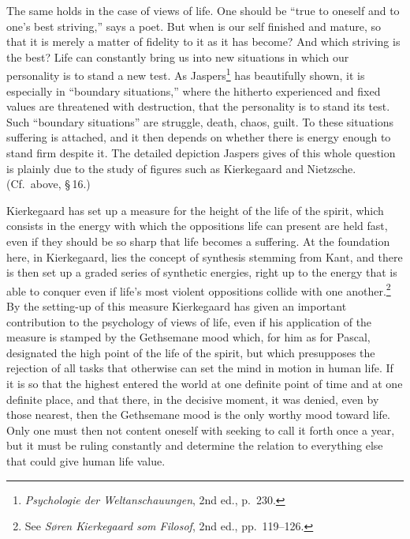 \documentclass[12pt]{book}
\newcommand{\opage}[1]{\marginnote{\footnotesize\textit{[#1]}}}
\begin{document}
The same holds in the case of views of life. One \opage{59}should be ``true to oneself and to one's best striving,''
says a poet. But when is our self finished and mature, so that it is merely a matter of fidelity to it as it
has become? And which striving is the best? Life can constantly bring us into new situations in which our
personality is to stand a new test. As Jaspers\footnote{\textit{Psychologie der Weltanschauungen}, 2nd ed.,
p.\ 230.} has beautifully shown, it is especially in ``boundary situations,'' where the hitherto experienced
and fixed values are threatened with destruction, that the personality is to stand its test. Such ``boundary
situations'' are struggle, death, chaos, guilt. To these situations suffering is attached, and it then
depends on whether there is energy enough to stand firm despite it. The detailed depiction Jaspers gives of
this whole question is plainly due to the study of figures such as Kierkegaard and Nietzsche. (Cf.\ above,
\S\,16.)

Kierkegaard has set up a measure for the height of the life of the spirit, which consists in the energy with which
the oppositions life can present are held fast, even if they should be so sharp that life becomes a
suffering. At the foundation here, in Kierkegaard, lies the concept of synthesis stemming from Kant, and
there is then set up a graded series of synthetic energies, right up to the energy that is able to conquer
even if life's most violent oppositions collide with one another.\footnote{See \textit{Søren Kierkegaard
som Filosof}, 2nd ed., pp.\ 119--126.} By the setting-up of this measure Kierkegaard has given an important
contribution to the psychology of views of life, even if his application of the measure is stamped by the
Gethsemane mood which, for him as for Pascal, designated the high point of the life of the spirit, but which
presupposes the rejection of all tasks that otherwise can set the mind in motion in human life. \opage{60}If it is so
that the highest entered the world at one definite point of time and at one definite place, and that there,
in the decisive moment, it was denied, even by those nearest, then the Gethsemane mood is the only worthy
mood toward life. Only one must then not content oneself with seeking to call it forth once a year, but it
must be ruling constantly and determine the relation to everything else that could give human life value.
\end{document}
